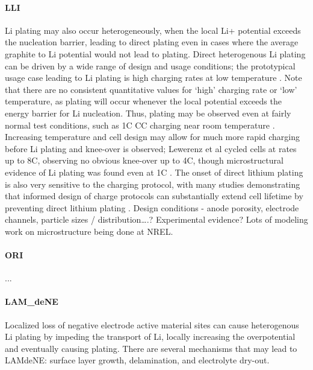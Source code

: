 \documentclass{article}
\begin{document}
\paragraph{LLI}
Li plating may also occur heterogeneously, when the local Li+ potential exceeds the nucleation barrier, leading to direct plating even in cases where the average graphite to Li potential would not lead to plating. Direct heterogenous Li plating can be driven by a wide range of design and usage conditions; the prototypical usage case leading to Li plating is high charging rates at low temperature \cite{waldmann_temperature_2014, petzl_lithium_2015}. Note that there are no consistent quantitative values for ‘high’ charging rate or ‘low’ temperature, as plating will occur whenever the local potential exceeds the energy barrier for Li nucleation. Thus, plating may be observed even at fairly normal test conditions, such as 1C CC charging near room temperature \cite{waldmann_optimization_2015,burns_-situ_2015}. Increasing temperature and cell design may allow for much more rapid charging before Li plating and knee-over is observed; Lewerenz et al cycled cells at rates up to 8C, observing no obvious knee-over up to 4C, though microstructural evidence of Li plating was found even at 1C \cite{lewerenz_systematic_2017}. The onset of direct lithium plating is also very sensitive to the charging protocol, with many studies demonstrating that informed design of charge protocols can substantially extend cell lifetime by preventing direct lithium plating \cite{waldmann_optimization_2015,schindler_fast_2018}.
Design conditions - anode porosity, electrode channels, particle sizes / distribution….? Experimental evidence? Lots of modeling work on microstructure being done at NREL.

\paragraph{ORI}
...

\paragraph{LAM_{deNE}}
Localized loss of negative electrode active material sites can cause heterogenous Li plating by impeding the transport of Li, locally increasing the overpotential and eventually causing plating. There are several mechanisms that may lead to LAMdeNE: surface layer growth, delamination, and electrolyte dry-out.
\end{document}
